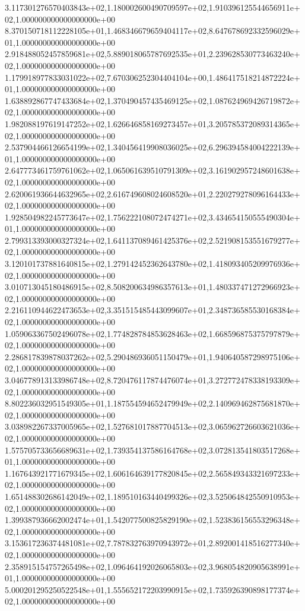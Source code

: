 3.117301276570403843e+02,1.180002600490709597e+02,1.910396125544656911e+02,1.000000000000000000e+00
8.370150718112228105e+01,1.468346679659404117e+02,8.647678692332596029e+01,1.000000000000000000e+00
2.918488052457859681e+02,5.889018065787692535e+01,2.239628530773463240e+02,1.000000000000000000e+00
1.179918977833031022e+02,7.670306252304404104e+00,1.486417518214872224e+01,1.000000000000000000e+00
1.638892867747433684e+02,1.370490457435469125e+02,1.087624969426719872e+02,1.000000000000000000e+00
1.982088197619147252e+02,1.626646858169273457e+01,3.205785372089314365e+02,1.000000000000000000e+00
2.537904466126654199e+02,1.340456419908036025e+02,6.296394584004222139e+01,1.000000000000000000e+00
2.647773461759761062e+02,1.065061639510791309e+02,3.161902957248601638e+02,1.000000000000000000e+00
2.620061936644632965e+02,2.616749608024608520e+01,2.220279278096164433e+02,1.000000000000000000e+00
1.928504982245773647e+02,1.756222108072474271e+02,3.434654150555490304e+01,1.000000000000000000e+00
2.799313393000327324e+02,1.641137089461425376e+02,2.521908153551679277e+02,1.000000000000000000e+00
3.120101737881640815e+02,1.279142452362643780e+02,1.418093405209976936e+02,1.000000000000000000e+00
3.010713045180486915e+02,8.508200634986357613e+01,1.480337471272966923e+02,1.000000000000000000e+00
2.216110944622473653e+02,3.351515485443099607e+01,2.348736585530168384e+02,1.000000000000000000e+00
1.059063367502496078e+02,1.774828784853628463e+02,1.668596875375797879e+02,1.000000000000000000e+00
2.286817839878037262e+02,5.290486936051150479e+01,1.940640587298975106e+02,1.000000000000000000e+00
3.046778913133986748e+02,8.720476117874476074e+01,3.272772478338193309e+02,1.000000000000000000e+00
8.802236032951549305e+01,1.187554594652479949e+02,2.140969462875681870e+02,1.000000000000000000e+00
3.038982267337005965e+02,1.527681017887704513e+02,3.065962726603621036e+02,1.000000000000000000e+00
1.575705733656689631e+02,1.739354137586164768e+02,3.072813541803517268e+01,1.000000000000000000e+00
1.167643921771679345e+02,1.606164639177820845e+02,2.565849343321697233e+02,1.000000000000000000e+00
1.651488302686142049e+02,1.189510163440499326e+02,3.525064842550910953e+02,1.000000000000000000e+00
1.399387936662002474e+01,1.542077500825829190e+02,1.523836156553296348e+02,1.000000000000000000e+00
3.153617236374481081e+02,7.787832763970943972e+01,2.892001418516277340e+02,1.000000000000000000e+00
2.358915154757265498e+02,1.096464192026065803e+02,3.968054820905638991e+01,1.000000000000000000e+00
5.000201295250522548e+01,1.555652172203990915e+02,1.735926390898177374e+02,1.000000000000000000e+00

